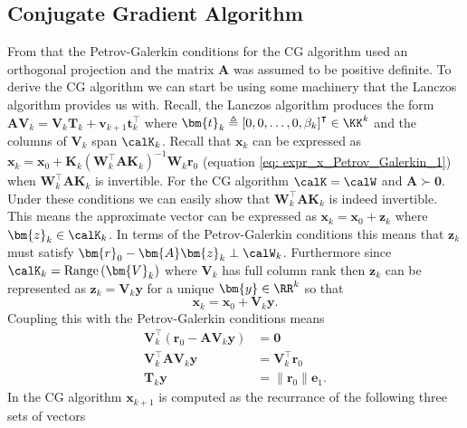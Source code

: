 \subsection{Conjugate Gradient Algorithm}\label{Section4.5}

From  that the Petrov-Galerkin conditions for the CG algorithm used an orthogonal projection and the matrix $\bm{A}$ was assumed to be positive definite. To derive the CG algorithm we can start be using some machinery that the Lanczos algorithm provides us with. Recall, the Lanczos algorithm produces the form $\bm{A}\bm{V}_{k} = \bm{V}_{k} \bm{T}_k + \bm{v}_{k+1} \bm{t}_{k}^{\intercal}$ where $\bm{t}_{k} \triangleq \left[ 0,0, \ldots , 0, \beta_k \right]^{\intercal} \in \KK^k$ and the columns of $\bm{V}_{k}$ span $\calK_k$. Recall that $\bm{x}_k$ can be expressed as $\bm{x}_k = \bm{x}_0 + \bm{K}_k \left( \bm{W}_k^{\intercal} \bm{A} \bm{K}_k \right)^{-1} \bm{W}_k \bm{r}_0$ (equation \ref{eq: expr_x_Petrov_Galerkin_1}) when $\bm{W}_k^{\intercal} \bm{A} \bm{K}_k$ is invertible. For the CG algorithm $\calK = \calW$ and $\bm{A} \succ \bm{0}$. Under these conditions we can easily show that $\bm{W}_k^{\intercal} \bm{A} \bm{K}_k$ is indeed invertible. This means the approximate vector can be expressed as $\bm{x}_k = \bm{x}_0 + \bm{z}_k$ where $\bm{z}_k \in \calK_k$. In terms of the Petrov-Galerkin conditions this means that $\bm{z}_k$ must satisfy $\bm{r}_0 - \bm{A} \bm{z}_k \perp \calW_k$. Furthermore since $\calK_k = \operatorname{Range} \left( \bm{V}_{k} \right)$ where $\bm{V}_{k}$ has full column rank then $\bm{z}_k$ can be represented as $\bm{z}_k = \bm{V}_{k} \bm{y}$ for a unique $\bm{y} \in \RR^k$ so that
\begin{equation} \label{eq: x_eq_Qky}
    \bm{x}_k = \bm{x}_0 + \bm{V}_{k} \bm{y}.
\end{equation}
Coupling this with the Petrov-Galerkin conditions means
\begin{align} \label{eq: Tky_eq_normr0e1}
    \bm{V}_{k}^{\intercal} \left( \bm{r}_0 - \bm{A} \bm{V}_{k} \bm{y} \right) & = \bm{0}                        \nonumber   \\
    \bm{V}_{k}^{\intercal} \bm{A} \bm{V}_{k} \bm{y}                           & = \bm{V}_{k}^{\intercal} \bm{r}_0 \nonumber \\
    \bm{T}_k \bm{y}                                                           & = \| \bm{r}_0 \| \bm{e}_1.
\end{align}
In the CG algorithm $\bm{x}_{k+1}$ is computed as the recurrance of the following three sets of vectors
